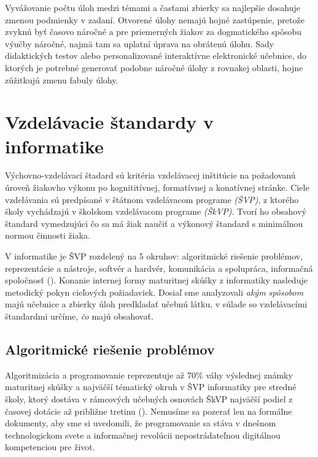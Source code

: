 Vyvážovanie počtu úloh medzi témami a časťami zbierky sa najlepšie dosahuje zmenou podmienky v zadaní. Otvorené úlohy nemajú hojné zastúpenie, pretože zvyknú byť časovo náročné a pre priemerných žiakov za dogmatického spôsobu výučby náročné, najmä tam sa uplatní úprava na obrátenú úlohu. Sady didaktických testov alebo personalizované interaktívne elektronické učebnice, do ktorých je potrebné generovať podobne náročné úlohy z rovnakej oblasti, hojne zúžitkujú zmenu fabuly úlohy.

\section{Vzdelávacie štandardy v informatike}
Výchovno-vzdelávací štadard sú kritéria vzdelávacej inštitúcie na požadovanú úroveň žiakovho výkonu po kognititívnej, formatívnej a konatívnej stránke. Ciele vzdelávania sú predpísané v štátnom vzdelávacom programe \emph{(ŠVP)}, z ktorého školy vychádzajú v školskom vzdelávacom programe \emph{(ŠkVP)}. Tvorí ho obsahový štandard vymedzujúci čo sa má žiak naučiť a výkonový štandard s minimálnou normou činnosti žiaka.

V informatike je ŠVP rozdelený na 5 okruhov: algoritmické riešenie problémov, reprezentácie a nástroje, softvér a hardvér, komunikácia a spolupráca, informačná spoločnosť (\cite{statny_2023}). Konanie internej formy maturitnej skúšky z informatiky nasleduje metodický pokyn cieľových požiadaviek. Dosiaľ sme analyzovali \emph{akým spôsobom} majú učebnice a zbierky úloh predkladať učebnú látku, v súlade so vzdelávacími štandardmi určíme, \emph{čo} majú obsahovať.

\subsection{Algoritmické riešenie problémov}
Algoritmizácia a programovanie reprezentuje až 70\% váhy výslednej známky maturitnej skúšky a najväčší tématický okruh v ŠVP informatiky pre stredné školy, ktorý dostáva v rámcových učebných osnovách ŠkVP najväčší podiel z časovej dotácie až približne tretinu (\cite{cp_2023}). Nemusíme sa pozerať len na formálne dokumenty, aby sme si uvedomili, že programovanie sa stáva v dnešnom technologickom svete a informačnej revolúcii nepostrádateľnou digitálnou kompetenciou pre život.

